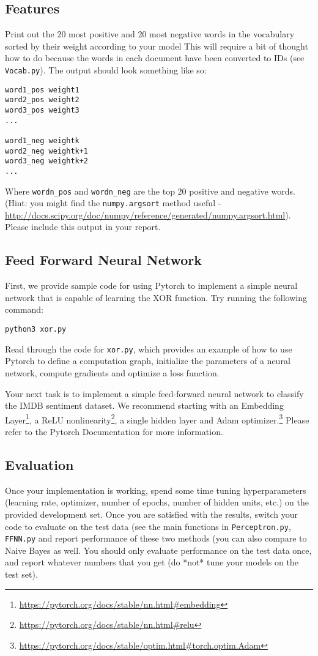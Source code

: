 \documentclass[12pt, letterpaper]{article}
\begin{document}
\subsection*{Features}
Print out the 20 most positive and 20 most negative words in
the vocabulary sorted by their weight according to your model
This will require a bit of thought how to do because the words in each document 
have been converted to IDs (see {\tt Vocab.py}).  The output should look something like so:
\begin{verbatim}
word1_pos weight1
word2_pos weight2
word3_pos weight3
...

word1_neg weightk
word2_neg weightk+1
word3_neg weightk+2
...
\end{verbatim}
Where {\tt wordn\_pos} and {\tt wordn\_neg} are the top 20 positive and negative words.  (Hint: you might find the {\tt numpy.argsort} method
useful - \url{http://docs.scipy.org/doc/numpy/reference/generated/numpy.argsort.html}).  Please include this output in your report.

\subsection*{Feed Forward Neural Network}
First, we provide sample code for using Pytorch to implement a simple neural network that is capable of learning the XOR function.  Try running the following command:
\begin{verbatim}
python3 xor.py
\end{verbatim}
Read through the code for {\tt xor.py}, which provides an example of how to use Pytorch to define a computation graph, initialize the parameters of a neural network, compute gradients and optimize a loss function.

Your next task is to implement a simple feed-forward neural network to classify the IMDB sentiment dataset.  We recommend starting with an Embedding Layer\footnote{\url{https://pytorch.org/docs/stable/nn.html\#embedding}}, a ReLU nonlinearity\footnote{\url{https://pytorch.org/docs/stable/nn.html\#relu}}, a single hidden layer and Adam optimizer.\footnote{\url{https://pytorch.org/docs/stable/optim.html\#torch.optim.Adam}}
Please refer to the Pytorch Documentation for more information.

\subsection*{Evaluation}
Once your implementation is working, spend some time tuning hyperparameters (learning rate, optimizer, number of epochs, number of hidden units, etc.) on the provided development set.
Once you are satisfied with the results, switch your code to evaluate on the test data (see the main functions in {\tt Perceptron.py}, {\tt FFNN.py} and report performance of these two methods (you can also compare to Naive Bayes as well.  You should only evaluate performance on the test data once, and report whatever numbers that you get (do *not* tune your models on the test set).
\end{document}
